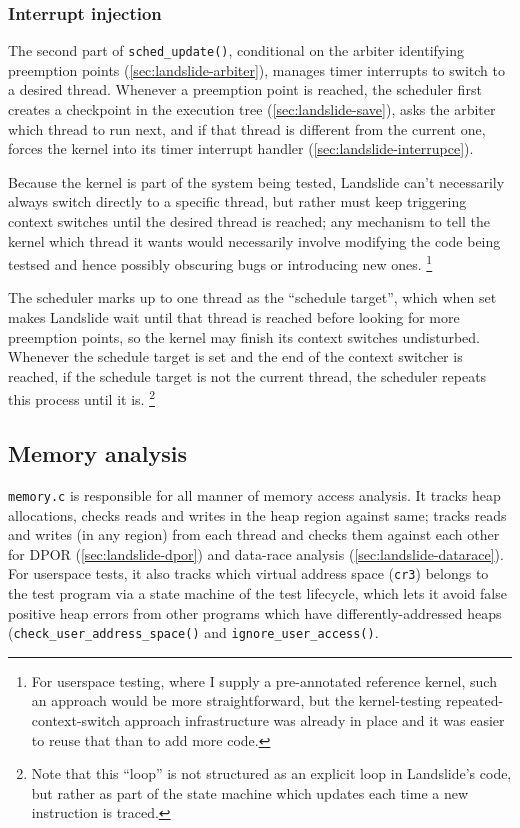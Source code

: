 \subsubsection{Interrupt injection}
\label{sec:landslide-scheduler-interrupce}

The second part of {\tt sched\_update()},
conditional on the arbiter identifying preemption points (\cref{sec:landslide-arbiter}),
manages timer interrupts to switch to a desired thread.
Whenever a preemption point is reached,
the scheduler first creates a checkpoint in the execution tree (\cref{sec:landslide-save}),
asks the arbiter which thread to run next,
and if that thread is different from the current one,
forces the kernel into its timer interrupt handler (\cref{sec:landslide-interrupce}).

Because the kernel is part of the system being tested, Landslide can't necessarily always switch directly to a specific thread,
but rather must keep triggering context switches until the desired thread is reached;
any mechanism to tell the kernel which thread it wants would necessarily involve modifying the code being testsed
and hence possibly obscuring bugs or introducing new ones.%
\footnote{For userspace testing, where I supply a pre-annotated reference kernel,
such an approach would be more straightforward,
but the kernel-testing repeated-context-switch approach infrastructure was already in place
and it was easier to reuse that than to add more code.}

The scheduler marks up to one thread as the ``schedule target'',
which when set makes Landslide wait until that thread is reached before looking for more preemption points,
so the kernel may finish its context switches undisturbed.
Whenever the schedule target is set and the end of the context switcher is reached,
if the schedule target is not the current thread,
the scheduler repeats this process until it is.%
\footnote{Note that this ``loop'' is not structured as an explicit loop in Landslide's code,
but rather as part of the state machine which updates each time a new instruction is traced.}


\subsection{Memory analysis}
\label{sec:landslide-memory}

{\tt memory.c} is responsible for all manner of memory access analysis.
It tracks heap allocations, checks reads and writes in the heap region against same;
tracks reads and writes (in any region) from each thread
and checks them against each other
for DPOR (\cref{sec:landslide-dpor})
and data-race analysis (\cref{sec:landslide-datarace}).
For userspace tests, it also tracks which virtual address space ({\tt cr3}) belongs to the test program
via a state machine of the test lifecycle,
which lets it avoid false positive heap errors from other programs which have differently-addressed heaps
({\tt check\_user\_address\_space()} and {\tt ignore\_user\_access()}.

